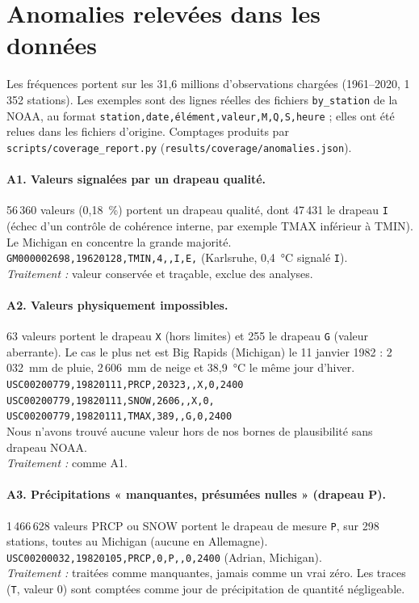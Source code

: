 \section{Anomalies relevées dans les données}
\label{annexe:anomalies}

Les fréquences portent sur les 31,6 millions d'observations chargées (1961--2020, 1\,352 stations). Les exemples sont des lignes réelles des fichiers \texttt{by\_station} de la NOAA, au format \texttt{station,date,élément,valeur,M,Q,S,heure} ; elles ont été relues dans les fichiers d'origine. Comptages produits par \texttt{scripts/coverage\_report.py} (\texttt{results/coverage/anomalies.json}).

\paragraph{A1. Valeurs signalées par un drapeau qualité.}
56\,360 valeurs (0,18~\%) portent un drapeau qualité, dont 47\,431 le drapeau \texttt{I} (échec d'un contrôle de cohérence interne, par exemple TMAX inférieur à TMIN). Le Michigan en concentre la grande majorité. \\
\texttt{GM000002698,19620128,TMIN,4,,I,E,} (Karlsruhe, 0,4~°C signalé \texttt{I}). \\
\emph{Traitement :} valeur conservée et traçable, exclue des analyses.

\paragraph{A2. Valeurs physiquement impossibles.}
63 valeurs portent le drapeau \texttt{X} (hors limites) et 255 le drapeau \texttt{G} (valeur aberrante). Le cas le plus net est Big Rapids (Michigan) le 11 janvier 1982 : 2\,032~mm de pluie, 2\,606~mm de neige et 38,9~°C le même jour d'hiver. \\
\texttt{USC00200779,19820111,PRCP,20323,,X,0,2400} \\
\texttt{USC00200779,19820111,SNOW,2606,,X,0,} \\
\texttt{USC00200779,19820111,TMAX,389,,G,0,2400} \\
Nous n'avons trouvé aucune valeur hors de nos bornes de plausibilité sans drapeau NOAA. \\
\emph{Traitement :} comme A1.

\paragraph{A3. Précipitations « manquantes, présumées nulles » (drapeau P).}
1\,466\,628 valeurs PRCP ou SNOW portent le drapeau de mesure \texttt{P}, sur 298 stations, toutes au Michigan (aucune en Allemagne). \\
\texttt{USC00200032,19820105,PRCP,0,P,,0,2400} (Adrian, Michigan). \\
\emph{Traitement :} traitées comme manquantes, jamais comme un vrai zéro. Les traces (\texttt{T}, valeur 0) sont comptées comme jour de précipitation de quantité négligeable.

